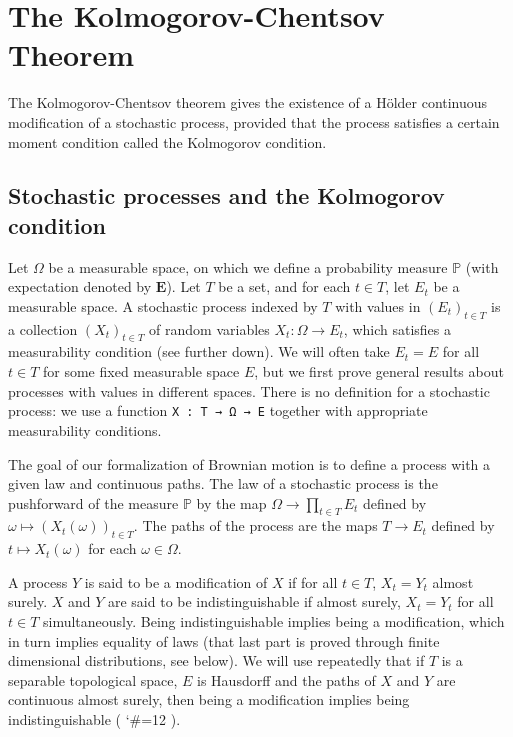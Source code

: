\documentclass[lean]{Draft}
\makeatletter
\newcommand\leanlink{\begingroup\catcode`\#=12\relax\@leanlink}
\newcommand\@leanlink[2]{\endgroup
\href{#1}
{\texttt{\detokenize{#2}}}}
\newcommand{\docs}[1]{%
\leanlink{https://remydegenne.github.io/brownian-motion/docs/find/?pattern=#1\#doc}
{#1}}
\makeatother
\begin{document}
\section{The Kolmogorov-Chentsov Theorem}
\label{S:continuity}

The Kolmogorov-Chentsov theorem gives the existence of a Hölder continuous modification of a stochastic process, provided that the process satisfies a certain moment condition called the Kolmogorov condition.


\subsection{Stochastic processes and the Kolmogorov condition}


Let $\Omega$ be a measurable space, on which we define a probability measure $\mathbb{P}$ (with expectation denoted by $\mathbf{E}$).
Let $T$ be a set, and for each $t \in T$, let $E_t$ be a measurable space.
A stochastic process indexed by $T$ with values in $(E_t)_{t \in T}$ is a collection $(X_t)_{t \in T}$ of random variables $X_t : \Omega \to E_t$, which satisfies a measurability condition (see further down).
We will often take $E_t = E$ for all $t \in T$ for some fixed measurable space $E$, but we first prove general results about processes with values in different spaces.
There is no \Lean definition for a stochastic process: we use a function \lstinline|X : T → Ω → E| together with appropriate measurability conditions.

The goal of our formalization of Brownian motion is to define a process with a given law and continuous paths.
The law of a stochastic process is the pushforward of the measure $\mathbb{P}$ by the map $\Omega \to \prod_{t \in T} E_t$ defined by $\omega \mapsto (X_t(\omega))_{t \in T}$.
The paths of the process are the maps $T \to E_t$ defined by $t \mapsto X_t(\omega)$ for each $\omega \in \Omega$.

A process $Y$ is said to be a modification of $X$ if for all $t \in T$, $X_t = Y_t$ almost surely.
$X$ and $Y$ are said to be indistinguishable if almost surely, $X_t = Y_t$ for all $t \in T$ simultaneously.
Being indistinguishable implies being a modification, which in turn implies equality of laws (that last part is proved through finite dimensional distributions, see below).
We will use repeatedly that if $T$ is a separable topological space, $E$ is Hausdorff and the paths of $X$ and $Y$ are continuous almost surely, then being a modification implies being indistinguishable (\docs{indistinguishable_of_modification}).
\end{document}
